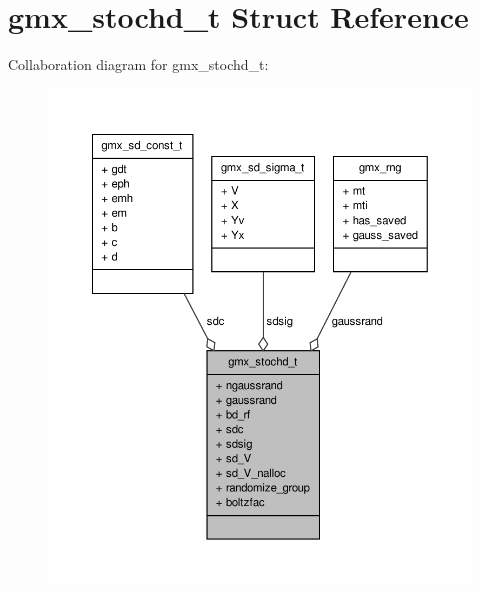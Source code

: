 \hypertarget{structgmx__stochd__t}{\section{gmx\-\_\-stochd\-\_\-t \-Struct \-Reference}
\label{structgmx__stochd__t}
}


\-Collaboration diagram for gmx\-\_\-stochd\-\_\-t\-:
\nopagebreak
\begin{figure}[H]
\begin{center}
\leavevmode
\includegraphics[width=350pt]{structgmx__stochd__t__coll__graph}
\end{center}
\end{figure}

